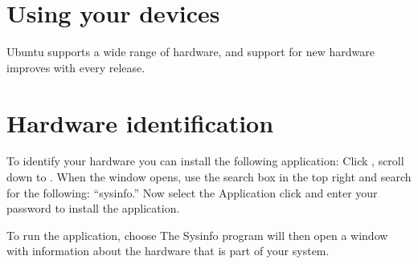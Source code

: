 \section{Using your devices}

Ubuntu supports a wide range of hardware, and support for new hardware improves with every release. 

\section{Hardware identification}

To identify your hardware you can install the following application: Click , scroll down to . When the  window opens, use the search box in the 
top right and search for the following: ``sysinfo.'' Now select the Application click  and enter your password to install the application.

To run the application, choose  The Sysinfo program will then open a window with information about the hardware that is part of your system.  





